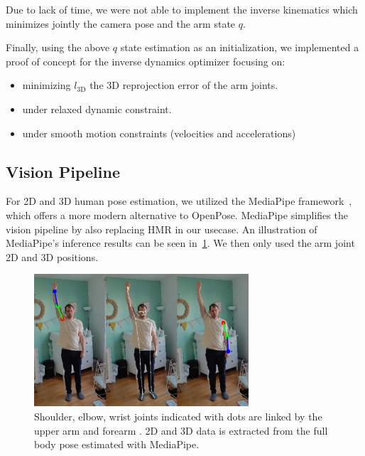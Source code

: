 Due to lack of time, we were not able to implement the inverse kinematics which minimizes jointly
the camera pose and the arm state $q$.

Finally, using the above $q$ state estimation as an initialization,
we implemented a proof of concept for the inverse dynamics optimizer focusing on:
\begin{itemize}
    \item minimizing $l_{\text{3D}}$ the 3D reprojection error of the arm joints.
    \item under relaxed dynamic constraint.
    \item under smooth motion constraints (velocities and accelerations)
\end{itemize}


\subsection{Vision Pipeline}
\label{subsec:vision_pipeline}

For 2D and 3D human pose estimation, we utilized the MediaPipe framework~\cite{lugaresi2019mediapipe}, which offers a more modern alternative 
to OpenPose. MediaPipe simplifies the vision pipeline by also replacing HMR in our usecase. An illustration of MediaPipe's inference results 
can be seen in~\cref{fig:mediapipe}. We then only used the arm joint 2D and 3D positions. 

\begin{figure}
    \centering
    \includegraphics[width=8cm]{figures/pose_detection_mediapipe_collage.png}
    \caption{
    \color{red}Shoulder, \color{darkgreen}elbow, \color{blue}wrist \color{black} joints indicated with dots
    are linked by the \color{darkgreen}upper arm \color{black} and \color{blue}forearm \color{black}. 2D and 3D data is extracted from
    the full body pose estimated with MediaPipe.
    }
    \label{fig:mediapipe}
\end{figure}

